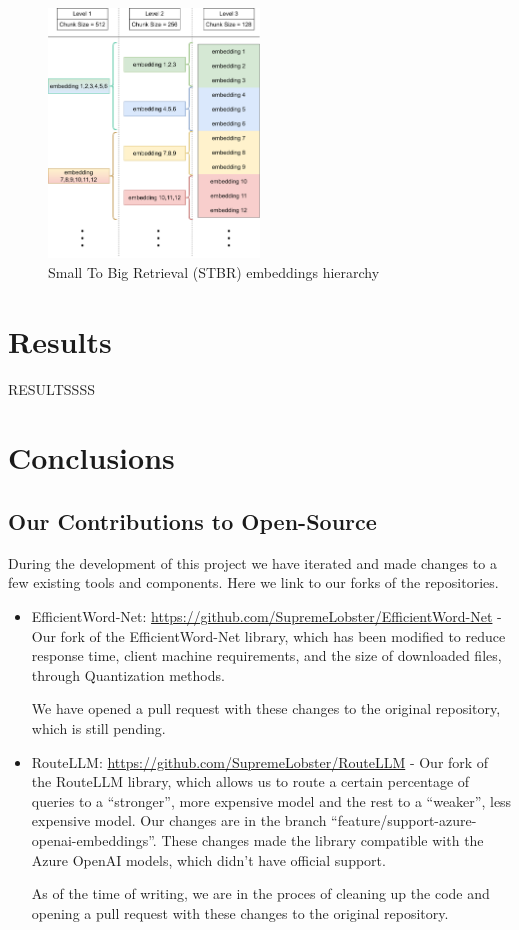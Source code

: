 \documentclass[a4paper,12pt,twoside]{ThesisStyle}
\begin{document}
\begin{figure}[htb]
  \centering
  \includegraphics[width=0.5\textwidth]{imatges/Small To Big Retrieval.drawio.png}
  \caption{Small To Big Retrieval (STBR) embeddings hierarchy}
  \label{fig:SmallToBigRetrieval}
\end{figure}

\chapter{Results}
\label{cap:results}

RESULTSSSS

\chapter{Conclusions}
\label{cap:conclusions}

\section{Our Contributions to Open-Source}
\label{sec:oss_contributions}

During the development of this project we have iterated and made changes to a few existing tools and components. Here we link to our forks of the repositories.

\begin{itemize}
  \item EfficientWord-Net: \url{https://github.com/SupremeLobster/EfficientWord-Net} - Our fork of the EfficientWord-Net library, which has been modified to reduce response time, client machine requirements, and the size of downloaded files, through Quantization methods.
  
  We have opened a pull request with these changes to the original repository, which is still pending.
  \item RouteLLM: \url{https://github.com/SupremeLobster/RouteLLM} - Our fork of the RouteLLM library, which allows us to route a certain percentage of queries to a ``stronger'', more expensive model and the rest to a ``weaker'', less expensive model. Our changes are in the branch ``feature/support-azure-openai-embeddings''. These changes made the library compatible with the Azure OpenAI models, which didn't have official support.
  
  As of the time of writing, we are in the proces of cleaning up the code and opening a pull request with these changes to the original repository.
\end{itemize}
\end{document}
